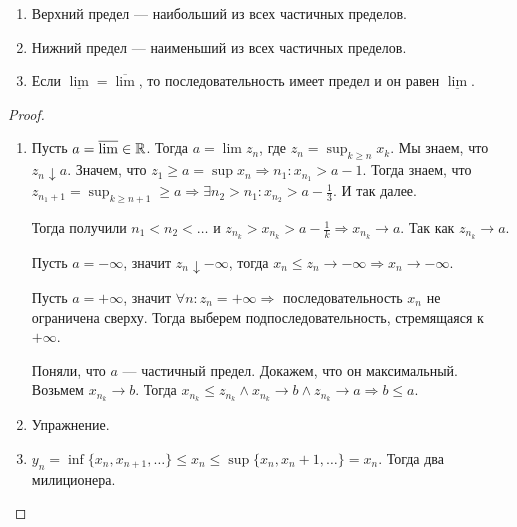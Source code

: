 \begin{theorem}
    \slashn
    \begin{enumerate}
        \item Верхний предел --- наибольший из всех частичных пределов.
        \item Нижний предел --- наименьший из всех частичных пределов.
        \item Если $\underline{\lim} = \overline{\lim}$, то последовательность имеет предел и он равен  $\underline{\lim}$.
    \end{enumerate}
\end{theorem}
\begin{proof}
    \slashn
    \begin{enumerate}
        \item Пусть $a = \overline{\lim} \in \mathbb{R}$. Тогда  $a = \lim z_n$, где  $z_n = \sup_{k \ge n} x_k$. Мы знаем, что $z_n \downarrow a$. Значем, что $z_1 \ge a = \sup x_n \Rightarrow n_1: x_{n_1} > a - 1$. Тогда знаем, что $z_{n_1+1} = \sup_{k \ge n + 1} \ge a \Rightarrow \exists n_2 > n_1: x_{n_2} > a-\frac{1}{3}$. И так далее.

            Тогда получили $n_1 < n_2 < \ldots$ и $z_{n_k} > x_{n_k} > a-\frac{1}{k} \Rightarrow x_{n_k} \to a$. Так как $z_{n_k} \to a$.

            Пусть $a = -\infty$, значит  $z_n \downarrow -\infty$, тогда  $x_n \le z_n \to -\infty \Rightarrow x_n \to -\infty$.

            Пусть $a = +\infty$, значит  $\forall n: z_n = +\infty \Rightarrow$ последовательность  $x_n$ не ограничена сверху. Тогда выберем подпоследовательность, стремящаяся к $+\infty$.

            Поняли, что  $a$ --- частичный предел. Докажем, что он максимальный. Возьмем $x_{n_k} \to b$. Тогда  $x_{n_k} \le z_{n_k} \land x_{n_k} \to b \land z_{n_k} \to a \Rightarrow b \le a$. 
        \item Упражнение.
        \item $y_n = \inf \{x_n, x_{n+1},\ldots\} \le x_n \le \sup \{x_n, x_n+1,\ldots\} = x_n$. Тогда два милиционера.
    \end{enumerate}
\end{proof}
